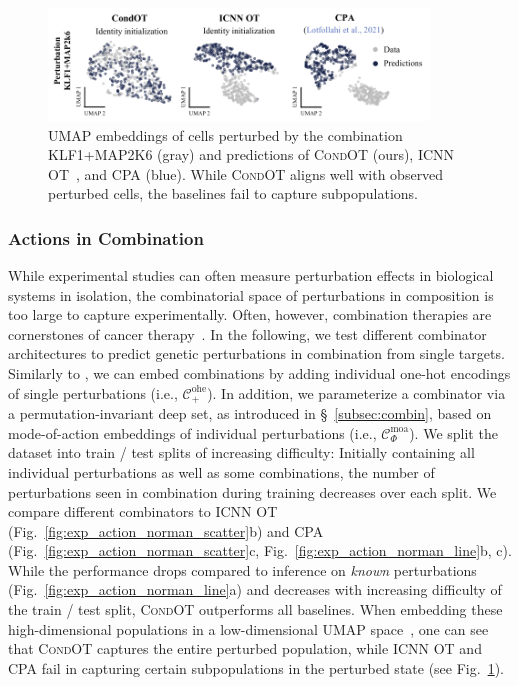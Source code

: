  \begin{figure}
    \centering
    \includegraphics[width=0.9\textwidth]{figures/fig_action_comb_comparison_umap.pdf}
    \caption{ UMAP embeddings of cells perturbed by the combination KLF1+MAP2K6 (gray) and predictions of \textsc{CondOT} (ours), \textsc{ICNN OT}~\citep{makkuva2020optimal}, and \textsc{CPA} (blue). While \textsc{CondOT} aligns well with observed perturbed cells, the baselines fail to capture subpopulations.}
    \label{fig:action_comb_comparison_umap}
\end{figure}
 

\subsubsection{Actions in Combination} \label{sec:eval_action_comb}
\vspace{-5pt}

 While experimental studies can often measure perturbation effects in biological systems in isolation, the combinatorial space of perturbations in composition is too large to capture experimentally. Often, however, combination therapies are cornerstones of cancer therapy~\citep{mokhtari2017combination}.
In the following, we test different combinator architectures to predict genetic perturbations in combination from single targets.
Similarly to \citet{lotfollahi2021compositional}, we can embed combinations by adding individual one-hot encodings of single perturbations (i.e., $\mathcal{C}^\text{ohe}_+$). In addition, we parameterize a combinator via a permutation-invariant deep set, as introduced in \S~\ref{subsec:combin}, based on mode-of-action embeddings of individual perturbations (i.e., $\mathcal{C}^\text{moa}_\Phi$). 
We split the dataset into train / test splits of increasing difficulty: Initially containing all individual perturbations as well as some combinations, the number of perturbations seen in combination during training decreases over each split.
We compare different combinators to \textsc{ICNN OT} (Fig.~\ref{fig:exp_action_norman_scatter}b) and \textsc{CPA}~\citep{lotfollahi2021compositional} (Fig.~\ref{fig:exp_action_norman_scatter}c, Fig.~\ref{fig:exp_action_norman_line}b, c). While the performance drops compared to inference on \emph{known} perturbations (Fig.~\ref{fig:exp_action_norman_line}a) and decreases with increasing difficulty of the train / test split, \textsc{CondOT} outperforms all baselines.
When embedding these high-dimensional populations in a low-dimensional UMAP space~\citep{umap}, one can see that \textsc{CondOT} captures the entire perturbed population, while \textsc{ICNN OT} and \textsc{CPA} fail in capturing certain subpopulations in the perturbed state (see Fig.~\ref{fig:action_comb_comparison_umap}).


